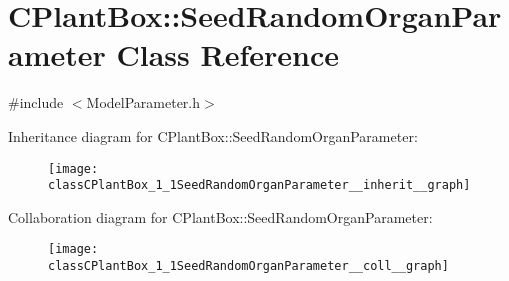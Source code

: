 \hypertarget{classCPlantBox_1_1SeedRandomOrganParameter}{}\section{C\+Plant\+Box\+:\+:Seed\+Random\+Organ\+Parameter Class Reference}
\label{classCPlantBox_1_1SeedRandomOrganParameter}


{\ttfamily \#include $<$Model\+Parameter.\+h$>$}



Inheritance diagram for C\+Plant\+Box\+:\+:Seed\+Random\+Organ\+Parameter\+:\nopagebreak
\begin{figure}[H]
\begin{center}
\leavevmode
\texttt{[image: classCPlantBox\_1\_1SeedRandomOrganParameter\_\_inherit\_\_graph]}
\end{center}
\end{figure}


Collaboration diagram for C\+Plant\+Box\+:\+:Seed\+Random\+Organ\+Parameter\+:\nopagebreak
\begin{figure}[H]
\begin{center}
\leavevmode
\texttt{[image: classCPlantBox\_1\_1SeedRandomOrganParameter\_\_coll\_\_graph]}
\end{center}
\end{figure}
